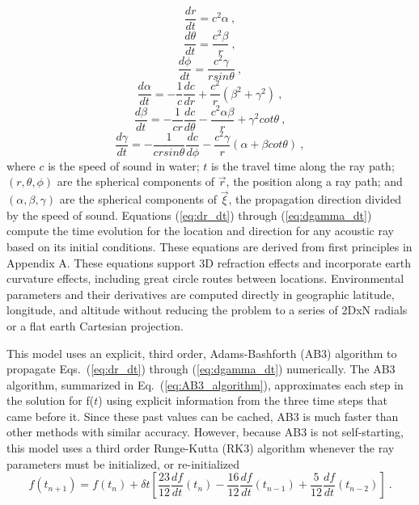 \documentclass{ws-jca}
\newcommand{\threeD}{3\nobreakdash\textendash D }	%
\newcommand{\twoDxN}{2\nobreakdash\textendash DxN }
\begin{document}
\begin{equation}
	\frac{dr}{dt} = c^2 \alpha \:,
	\label{eq:dr_dt}
\end{equation}
\begin{equation}
	\frac{d\theta}{dt} = \frac{c^2 \beta}{r} \:,
	\label{eq:dtheta_dt}
\end{equation}
\begin{equation}
	\frac{d\phi}{dt} = \frac{c^2\gamma}{r sin\theta} \:,
	\label{eq:dphi_dt}
\end{equation}
\begin{equation}
	\frac{d\alpha}{dt} = -\frac{1}{c}\frac{dc}{dr} 
		+ \frac{c^2}{r}\left( \beta^2 + \gamma^2 \right) \:,
	\label{eq:dalpha_dt}
\end{equation}
\begin{equation}
	\frac{d\beta}{dt} = -\frac{1}{cr}\frac{dc}{d\theta} 
		- \frac{c^2 \alpha \beta}{r} + \gamma^2 cot\theta \:,
	\label{eq:dbeta_dt}
\end{equation}
\begin{equation}
	\frac{d\gamma}{dt} = -\frac{1}{cr sin\theta}\frac{dc}{d\phi} 
		- \frac{c^2 \gamma}{r} \left( \alpha + \beta cot\theta \right) \:,
	\label{eq:dgamma_dt}
\end{equation}
where 
$c$ is the speed of sound in water; 
$t$ is the travel time along the ray path;
\((r,\theta,\phi)\) are the spherical components of \(\vec{r}\), the position along a ray path; and
\((\alpha,\beta,\gamma)\) are the spherical components of \(\vec{\xi}\), the propagation direction divided by the speed of sound.
Equations (\ref{eq:dr_dt}) through (\ref{eq:dgamma_dt}) compute the time
evolution for the location and direction for any acoustic ray based on its
initial conditions. These equations are derived from first principles in
Appendix A. These equations support \threeD refraction effects and
incorporate earth curvature effects, including great circle routes between
locations. Environmental parameters and their derivatives are computed
directly in geographic latitude, longitude, and altitude without reducing
the problem to a series of \twoDxN radials or a flat earth Cartesian
projection.

This model uses an explicit, third order, Adams-Bashforth (AB3)
algorithm\cite{Yakowitz1986} to propagate Eqs.~(\ref{eq:dr_dt}) through
(\ref{eq:dgamma_dt}) numerically. The AB3 algorithm, summarized in
Eq.~(\ref{eq:AB3_algorithm}), approximates each step in the solution for
f(\(t\)) using explicit information from the three time steps that
came before it. Since these past values can be cached, AB3 is much faster
than other methods with similar accuracy. However, because AB3 is not self-starting,
this model uses a third order Runge-Kutta (RK3) algorithm\cite{Press1992}
whenever the ray parameters must be initialized, or re-initialized
\begin{equation}
	f(t_{n+1}) = f(t_{n}) + \delta t \left[ 
		\frac{23}{12} \frac{df}{dt}(t_n)
	  	- \frac{16}{12} \frac{df}{dt}(t_{n-1}) 
	  	+ \frac{5}{12} \frac{df}{dt}(t_{n-2}) \right] \:.
	\label{eq:AB3_algorithm}
\end{equation}
\end{document}
